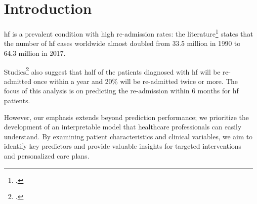 \section{Introduction}

\gls{hf} is a prevalent condition with high re-admission rates: the literature\footcite{Bragazzi2021Burden} states that the number of \gls{hf} cases worldwide almost doubled from 33.5 million in 1990 to 64.3 million in 2017.

Studies\footcite{Groenewegen2020Epidemiology} also suggest that half of the patients diagnosed with \gls{hf} will be re-admitted once within a year and 20\% will be re-admitted twice or more. The focus of this analysis is on predicting the re-admission within 6 months for \gls{hf} patients.

However, our emphasis extends beyond prediction performance; we prioritize the development of an interpretable model that healthcare professionals can easily understand. By examining patient characteristics and clinical variables, we aim to identify key predictors and provide valuable insights for targeted interventions and personalized care plans.
